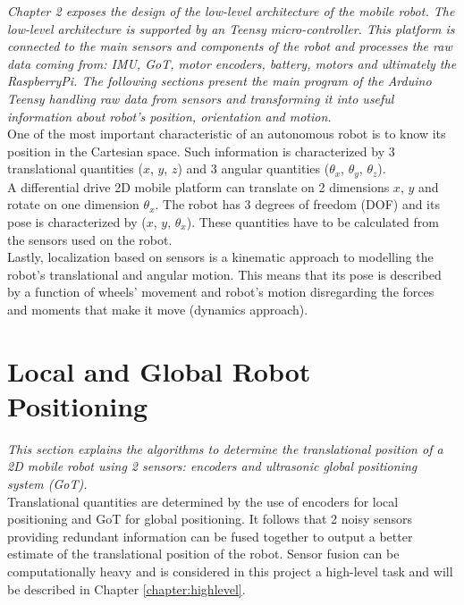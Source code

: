 \label{chapter:lowlevel}
\textit{Chapter 2 exposes the design of the low-level architecture of the mobile robot. The low-level architecture is supported by an Teensy micro-controller. This platform is connected to the main sensors and components of the robot and processes the raw data coming from: IMU, GoT, motor encoders, battery, motors and ultimately the RaspberryPi. The following sections present the main program of the Arduino Teensy handling raw data from sensors and transforming it into useful information about robot's position, orientation and motion.}\\

One of the most important characteristic of an autonomous robot is to know its position in the Cartesian space. Such information is characterized by 3 translational quantities ($x$, $y$, $z$) and 3 angular quantities ($\theta_x$, $\theta_y$, $\theta_z$).\\

A differential drive 2D mobile platform can translate on 2 dimensions $x$, $y$ and rotate on one dimension $\theta_x$. The robot has 3 degrees of freedom (DOF) and its pose is characterized by ($x$, $y$, $\theta_x$). These quantities have to be calculated from the sensors used on the robot.\\

Lastly, localization based on sensors is a kinematic approach to modelling the robot's translational and angular motion. This means that its pose is described by a function of wheels' movement and robot's motion disregarding the forces and moments that make it move (dynamics approach).\cite{robotics}\\ 

\section{Local and Global Robot Positioning}

\textit{This section explains the algorithms to determine the translational position of a 2D mobile robot using 2 sensors: encoders and ultrasonic global positioning system (GoT).}\\

Translational quantities are determined by the use of encoders for local positioning and GoT for global positioning. It follows that 2 noisy sensors providing redundant information can be fused together to output a better estimate of the translational position of the robot. Sensor fusion can be computationally heavy and is considered in this project a high-level task and will be described in Chapter \ref{chapter:highlevel}.\\


